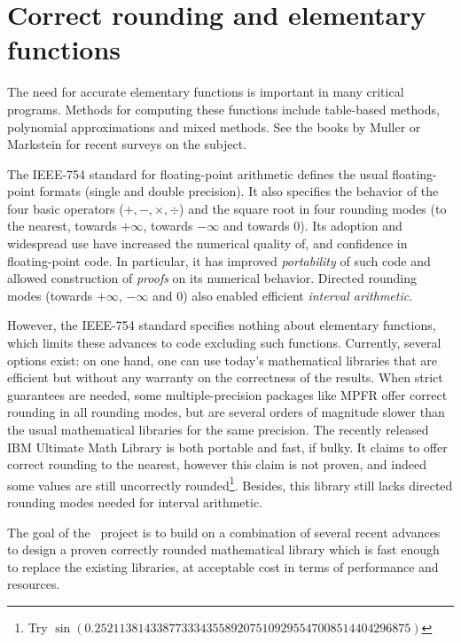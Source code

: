 


\section{Correct rounding and elementary functions}
\label{sect:intro}

The need for accurate elementary functions is important in many
critical programs.  Methods for computing these functions include
table-based methods\cite{Far81,Tan91}, polynomial approximations and
mixed methods\cite{DauMor2k}. See the books by Muller\cite{Muller97} or
Markstein\cite{Markstein2000} for recent surveys on the subject.

The IEEE-754 standard for floating-point arithmetic\cite{IEEE754}
defines the usual floating-point formats (single and double
precision). It also specifies the behavior of the four basic operators
($+,-,\times,\div$) and the square root in four rounding modes (to the
nearest, towards $+\infty$, towards $-\infty$ and towards $0$). Its
adoption and widespread use have increased the numerical quality of,
and confidence in floating-point code. In particular, it has improved
\emph{portability} of such code and allowed construction of
\emph{proofs} on its numerical behavior. Directed rounding modes
(towards $+\infty$, $-\infty$ and $0$) also enabled efficient
\emph{interval arithmetic}\cite{Moore66,KKLRW93}.

However, the IEEE-754 standard specifies nothing about elementary
functions, which limits these advances to code excluding such
functions.  Currently, several options exist: on one hand, one can use
today's mathematical libraries that are efficient but without any
warranty on the correctness of the results. When strict guarantees are
needed, some multiple-precision packages like MPFR \cite{MPFRweb}
offer correct rounding in all rounding modes, but are several orders
of magnitude slower than the usual mathematical libraries for the same
precision. The recently released IBM Ultimate Math
Library\cite{IBMlibultimweb} is both portable and fast, if bulky. It
claims to offer correct rounding to the nearest, however this claim is
not proven, and indeed some values are still uncorrectly
rounded\footnote{Try
  $\sin(0.252113814338773334355892075109295547008514404296875)$}.
Besides, this library still lacks directed rounding modes needed for
interval arithmetic.


The  goal of the \crlibm\ project is to build on a combination of several
recent advances to design a proven  correctly rounded mathematical
library which is fast enough to replace the existing libraries, at acceptable
 cost in terms of performance and resources.




